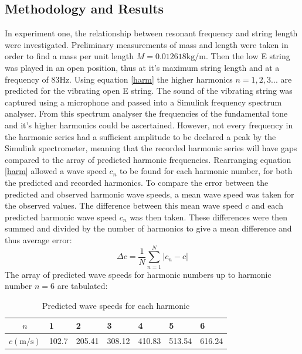 \documentclass[11pt]{article}
\begin{document}
        \subsection{Methodology and Results}
            In experiment one, the relationship between resonant frequency and string length were investigated.
            Preliminary measurements of mass and length were taken in order to find a mass per unit length $M = 0.012618\si{\kilogram\per\meter}$.
            Then the low E string was played in an open position, thus at it's maximum string length and at a frequency of $83\si{\hertz}$.
            Using equation \ref{harm} the higher harmonics $n = 1, 2 ,3 ...$ are predicted for the vibrating open E string.
            The sound of the vibrating string was captured using a microphone and passed into a Simulink frequency spectrum analyser.
            From this spectrum analyser the frequencies of the fundamental tone and it's higher harmonics could be ascertained.
            However, not every frequency in the harmonic series had a sufficient amplitude to be declared a peak by the Simulink spectrometer, meaning that the recorded harmonic series will have gaps compared to the array of predicted harmonic frequencies.
            Rearranging equation \ref{harm} allowed a wave speed $c_n$ to be found for each harmonic number, for both the predicted and recorded harmonics.
            To compare the error between the predicted and observed harmonic wave speeds, a mean wave speed was taken for the observed values.
            The difference between this mean wave speed $c$ and each predicted harmonic wave speed $c_n$ was then taken.
            These differences were then summed and divided by the number of harmonics to give a mean difference and thus average error:
            \begin{equation}
                \Delta c = \frac{1}{N}\sum_{n=1}^{N} | c_n - c |
            \end{equation}
            The array of predicted wave speeds for harmonic numbers up to harmonic number $n=6$ are tabulated:
            \begin{table}[H]
                \centering
                \begin{tabular}{c | l l l l l l}
                    \hline
                    $n$ & 1 & 2 & 3 & 4 & 5 & 6 \\
                    \hline
                    $c(\si{\meter\per\second})$ & 102.7 & 205.41 & 308.12 & 410.83 & 513.54 & 616.24 \\
                    \hline
                \end{tabular}
                \caption{Predicted wave speeds for each harmonic}
            \end{table}
\end{document}
